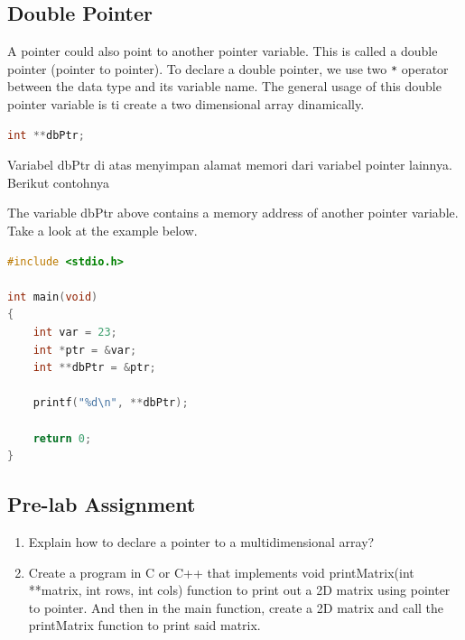 \subsection{Double Pointer}
A pointer could also point to another pointer variable. This is called a double pointer (pointer to pointer).
To declare a double pointer, we use two \verb|*| operator between the data type and its variable name. 
The general usage of this double pointer variable is ti create a two dimensional array dinamically.
\begin{lstlisting}[language=c]
    int **dbPtr;
\end{lstlisting}
Variabel dbPtr di atas menyimpan alamat memori dari variabel pointer lainnya. \\
Berikut contohnya

The variable dbPtr above contains a memory address of another pointer variable.\\
Take a look at the example below.
\begin{lstlisting}[language=c,  caption={Double Pointer Example}]
#include <stdio.h>

int main(void)
{
    int var = 23;
    int *ptr = &var;
    int **dbPtr = &ptr;

    printf("%d\n", **dbPtr);
        
    return 0;
}
\end{lstlisting}

\subsection{Pre-lab Assignment}
\begin{enumerate}
   \item Explain how to declare a pointer to a multidimensional array?
   \item Create a program in C or C++ that implements void printMatrix(int **matrix, int rows, int cols) function
   to print out a 2D matrix using pointer to pointer. And then in the main function, create a 2D matrix and call the
   printMatrix function to print said matrix.
\end{enumerate}

